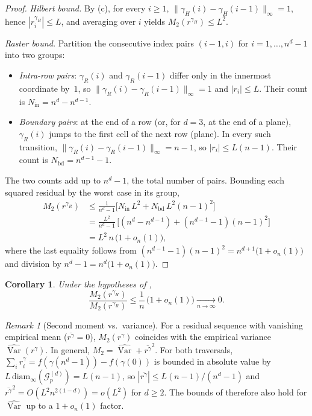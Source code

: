 \documentclass[11pt,a4paper]{article}
\theoremstyle{plain}
\newtheorem{corollary}[theorem]{Corollary}
\theoremstyle{definition}
\theoremstyle{remark}
\newtheorem{remark}[theorem]{Remark}
\newcommand{\Grid}{\mathcal{G}}
\DeclareMathOperator{\Var}{Var}
\begin{document}
\begin{proof}
\emph{Hilbert bound.} By (c), for every $i\geq 1$,
$\|\gamma_H(i)-\gamma_H(i-1)\|_\infty = 1$, hence
$|r^{\gamma_H}_i|\leq L$, and averaging over $i$ yields
$M_2(r^{\gamma_H})\leq L^2$.

\emph{Raster bound.} Partition the consecutive index pairs
$(i-1,i)$ for $i=1,\dots,n^d-1$ into two groups:
\begin{itemize}[nosep]
\item \emph{Intra-row pairs}: $\gamma_R(i)$ and $\gamma_R(i-1)$ differ
only in the innermost coordinate by~$1$, so
$\|\gamma_R(i)-\gamma_R(i-1)\|_\infty = 1$ and $|r_i|\leq L$. Their
count is $N_{\mathrm{in}} = n^d - n^{d-1}$.
\item \emph{Boundary pairs}: at the end of a row (or, for $d=3$, at the
end of a plane), $\gamma_R(i)$ jumps to the first cell of the next row
(plane). In every such transition,
$\|\gamma_R(i)-\gamma_R(i-1)\|_\infty = n-1$, so $|r_i|\leq L(n-1)$.
Their count is $N_{\mathrm{bd}} = n^{d-1}-1$.
\end{itemize}
The two counts add up to $n^d-1$, the total number of pairs. Bounding
each squared residual by the worst case in its group,
\begin{align*}
M_2(r^{\gamma_R})
 & \leq \tfrac{1}{n^d-1}\bigl[
   N_{\mathrm{in}}\,L^2 + N_{\mathrm{bd}}\,L^2(n-1)^2 \bigr] \\
 & = \tfrac{L^2}{n^d-1}\,
     \bigl[(n^d-n^{d-1}) + (n^{d-1}-1)(n-1)^2\bigr] \\
 & = L^2\,n\,\bigl(1 + o_n(1)\bigr),
\end{align*}
where the last equality follows from
$(n^{d-1}-1)(n-1)^2 = n^{d+1}\bigl(1+o_n(1)\bigr)$ and division by
$n^d-1 = n^d\bigl(1+o_n(1)\bigr)$.
\end{proof}

\begin{corollary}\label{cor:dpcm_ratio}
Under the hypotheses of ,
\[
\frac{M_2(r^{\gamma_H})}{M_2(r^{\gamma_R})}
\leq \frac{1}{n}\,\bigl(1+o_n(1)\bigr) \xrightarrow[n\to\infty]{} 0.
\]
\end{corollary}

\begin{remark}[Second moment vs.\ variance]\label{rem:m2_vs_var}
For a residual sequence with vanishing empirical mean
($\overline{r^\gamma}=0$), $M_2(r^\gamma)$ coincides with the empirical
variance $\widehat{\Var}(r^\gamma)$. In general,
$M_2 = \widehat{\Var} + \overline{r^\gamma}^2$. For both traversals,
$\sum_i r^\gamma_i = f(\gamma(n^d-1)) - f(\gamma(0))$ is bounded in
absolute value by $L\,\mathrm{diam}_\infty(\Grid_p^{(d)}) = L(n-1)$, so
$|\overline{r^\gamma}|\leq L(n-1)/(n^d-1)$ and
$\overline{r^\gamma}^2 = O(L^2 n^{2(1-d)}) = o(L^2)$ for $d\geq 2$.
The bounds of  therefore also hold for
$\widehat{\Var}$ up to a $1+o_n(1)$ factor.
\end{remark}
\end{document}
